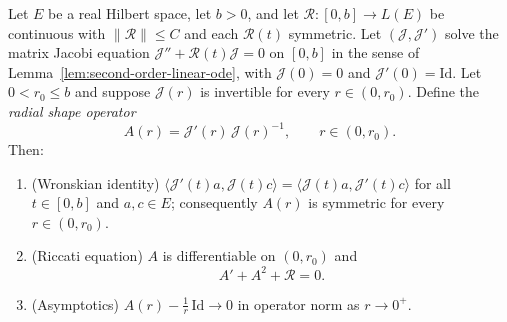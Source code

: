 \begin{lemma}
\label{lem:radial-shape-riccati}
\leanok
Let $E$ be a real Hilbert space, let $b>0$, and let
$\mathcal R\colon[0,b]\to L(E)$ be continuous with
$\|\mathcal R\|\le C$ and each $\mathcal R(t)$ symmetric. Let
$({\mathcal J},{\mathcal J}')$ solve the matrix Jacobi equation
${\mathcal J}''+{\mathcal R}(t){\mathcal J}=0$ on $[0,b]$ in the sense
of Lemma~\ref{lem:second-order-linear-ode}, with ${\mathcal J}(0)=0$
and ${\mathcal J}'(0)=\mathrm{Id}$. Let $0<r_0\le b$ and suppose
${\mathcal J}(r)$ is invertible for every $r\in(0,r_0)$. Define the
\emph{radial shape operator}
$$A(r)={\mathcal J}'(r)\,{\mathcal J}(r)^{-1},\qquad r\in(0,r_0).$$
Then:
\begin{enumerate}
\item (Wronskian identity) $\langle{\mathcal J}'(t)a,{\mathcal
J}(t)c\rangle=\langle{\mathcal J}(t)a,{\mathcal J}'(t)c\rangle$ for all
$t\in[0,b]$ and $a,c\in E$; consequently $A(r)$ is symmetric for every
$r\in(0,r_0)$.
\item (Riccati equation) $A$ is differentiable on $(0,r_0)$ and
$$A'+A^2+{\mathcal R}=0 .$$
\item (Asymptotics) $A(r)-\tfrac1r\,\mathrm{Id}\to0$ in operator norm
as $r\to0^+$.
\end{enumerate}
\end{lemma}


